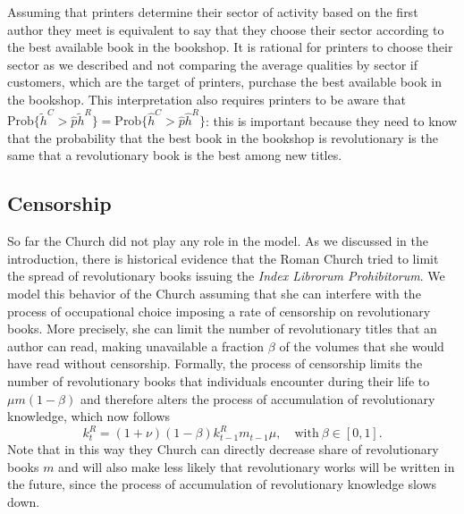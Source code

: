 \documentclass[12pt]{article}
\begin{document}
 Assuming that printers determine their sector of activity based on the first author they meet is equivalent to say that they choose their sector according to the best available book in the bookshop. It is rational for printers to choose their sector as we described and not comparing the average qualities by sector if customers, which are the target of printers, purchase the best available book in the bookshop. This interpretation also requires printers to be aware that $\text{Prob}\{\tilde{h}^C>\hat{p}\tilde{h}^R\}=\text{Prob}\{\hat{h}^C>\hat{p}\hat{h}^R\}$: this is important because they need to know that the probability that the best book in the bookshop is revolutionary is the same that a revolutionary book is the best among new titles.

\subsection{Censorship}\label{subsection:censor}

So far the Church did not play any role in the model. As we discussed in the introduction, there is historical evidence that the Roman Church tried to limit the spread of revolutionary books issuing the \textit{Index Librorum Prohibitorum}. We model this behavior of the Church assuming that she can interfere  with the process of occupational choice imposing a rate of censorship on revolutionary books. More precisely, she can limit the number of revolutionary titles that an author can read, making unavailable a fraction $\beta$ of the volumes that she would have read without censorship. Formally, the process of censorship limits the number of revolutionary books that individuals encounter during their life to $\mu m (1-\beta)$ and therefore alters the process of accumulation of revolutionary knowledge, which now follows
\begin{equation}\label{eq:censorhip}
k_{t}^R=(1+\nu)(1-\beta)k_{t-1}^R m_{t-1} \mu, \quad\text{with} \ \beta\in[0,1].
\end{equation}
Note that in this way they Church can directly decrease share of revolutionary books $m$ and will also make less likely that revolutionary works will be written in the future, since the process of accumulation of revolutionary knowledge slows down.
\end{document}
